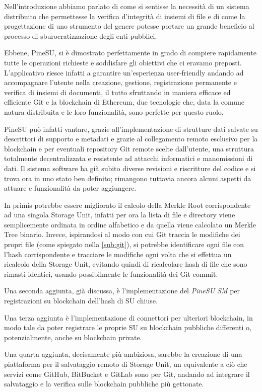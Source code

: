 \label{cap:sf}
Nell'introduzione abbiamo parlato di come si sentisse la necessità
di un sistema distribuito che permettesse la verifica d'integrità
di insiemi di file e di come la progettazione di uno strumento del
genere potesse portare un grande beneficio al processo di
sburocratizzazione degli enti pubblici.

Ebbene, PineSU, si è dimostrato perfettamente in grado di
compiere rapidamente tutte le operazioni richieste e soddisfare gli
obiettivi che ci eravamo preposti.
L'applicativo riesce infatti a garantire un'esperienza user-friendly andando ad 
accompagnare l'utente nella 
creazione, gestione, registrazione permanente e verifica di insiemi di documenti,
il tutto sfruttando in maniera efficace ed efficiente Git e la blockchain di Ethereum,
due tecnologie che, data la comune natura distribuita e le loro funzionalità,
sono perfette per questo ruolo.

PineSU può infatti vantare, grazie all'implementazione di strutture dati salvate
su descrittori di supporto e metadati e grazie al collegamento remoto esclusivo per la blockchain
e per eventuali repository Git remote scelte dall'utente, una struttura totalmente
decentralizzata e resistente ad attacchi informatici e manomissioni di dati.
Il sistema software ha già subito diverse revisioni e riscritture del codice e si trova ora in uno
stato ben definito; rimangono tuttavia ancora alcuni aspetti da attuare e funzionalità da poter aggiungere.

In primis potrebbe essere migliorato il calcolo della Merkle Root corrispondente
ad una singola Storage Unit, infatti per ora la lista di file e directory viene
semplicemente ordinata in ordine alfabetico e da quella viene calcolato
un Merkle Tree binario. Invece, ispirandosi al modo con cui Git traccia le modifiche
dei propri file (come spiegato nella \autoref{sub:git}),
si potrebbe identificare ogni file con l'hash corrispondente e tracciare le modifiche ogni
volta che si effettua un ricalcolo della Storage Unit, evitando quindi di ricalcolare hash
di file che sono rimasti identici, usando possibilmente le funzionalità dei Git commit.

Una seconda aggiunta, già discussa, è l'implementazione del \emph{PineSU SM}
per registrazioni su blockchain dell'hash di SU chiuse.

Una terza aggiunta è l'implementazione di connettori per ulteriori blockchain, in modo tale
da poter registrare le proprie SU su blockchain pubbliche differenti o, potenzialmente,
anche su blockchain private.

\thispagestyle{mystyle}
Una quarta aggiunta, decisamente più ambiziosa, sarebbe la creazione di una piattaforma
per il salvataggio remoto di Storage Unit, un equivalente a ciò che servizi come GitHub,
BitBucket e GitLab sono per Git, andando ad integrare il salvataggio e la verifica sulle
blockchain pubbliche più gettonate.